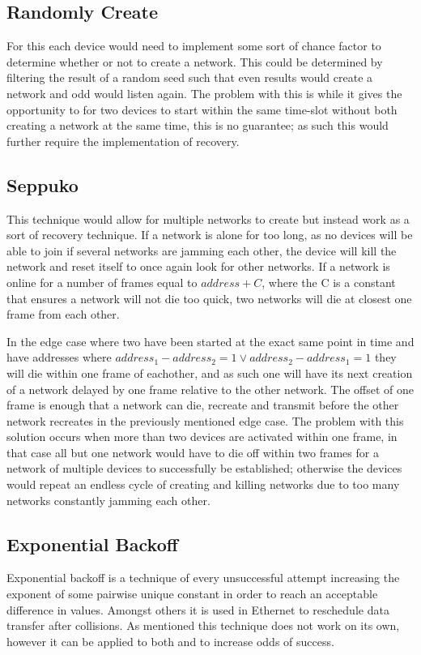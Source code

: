 \subsection{Randomly Create}\label{RCreate}
For this each device would need to implement some sort of chance factor to determine whether or not to create a network.
This could be determined by filtering the result of a random seed such that even results would create a network and odd would listen again.
The problem with this is while it gives the opportunity to for two devices to start within the same time-slot without both creating a network at the same time, this is no guarantee; as such this would further require the implementation of recovery.

\subsection{Seppuko}\label{KtN}
This technique would allow for multiple networks to create but instead work as a sort of recovery technique.
If a network is alone for too long, as no devices will be able to join if several networks are jamming each other, the device will kill the network and reset itself to once again look for other networks.
If a network is online for a number of frames equal to $address + C$, where the C is a constant that ensures a network will not die too quick, two networks will die at closest one frame from each other.

\bigskip \noindent
In the edge case where two have been started at the exact same point in time and have addresses where $address_1 - address_2 = 1 \lor address_2 - address_1 = 1$ they will die within one frame of eachother, and as such one will have its next creation of a network delayed by one frame relative to the other network.
The offset of one frame is enough that a network can die, recreate and transmit before the other network recreates in the previously mentioned edge case.
The problem with this solution occurs when more than two devices are activated within one frame, in that case all but one network would have to die off within two frames for a network of multiple devices to successfully be established; otherwise the devices would repeat an endless cycle of creating and killing networks due to too many networks constantly jamming each other.

\subsection{Exponential Backoff}
Exponential backoff is a technique of every unsuccessful attempt increasing the exponent of some pairwise unique constant in order to reach an acceptable difference in values.
Amongst others it is used in Ethernet to reschedule data transfer after collisions. \citep{Ebackoff}
As mentioned this technique does not work on its own, however it can be applied to both  and  to increase odds of success.
